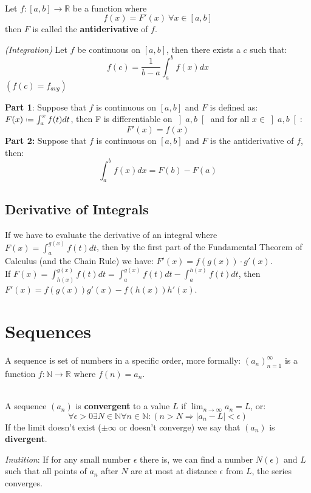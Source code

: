 \documentclass[8pt,a4paper]{extarticle}     %
\theoremstyle{definition}
\theoremstyle{definition}
\theoremstyle{definition}
\newcommand{\R}{\mathbb{R}}
\newcommand{\N}{\mathbb{N}}
\newcommand*{\defeq}{\mathrel{\vcenter{\baselineskip0.5ex \lineskiplimit0pt
            \hbox{\scriptsize.}\hbox{\scriptsize.}}}%
            =}
\begin{document}
\begin{multicols}{4}
\begin{bulletlist}
\end{bulletlist}
\begin{boxdefinition}[Antiderivative] \ \\
	Let $f:[a,b]\rightarrow\R$ be a function where $$f(x) = F'(x) \ \forall x\in[a,b]$$ then $F$ is called the \textbf{antiderivative} of $f$.
\end{boxdefinition}
\begin{boxtheorem}
	\textit{(Integration)} Let $f$ be continuous on $[a,b]$, then there exists a $c$ such that: $$f(c) = \frac{1}{b-a}\int_a^b f(x)dx$$
	$(f(c) = f_{avg})$
\end{boxtheorem}
\begin{boxtheorem}
	\textbf{Part 1}: Suppose that $f$ is continuous on $[a,b]$ and $F$ is defined as: $F(x) \defeq \int_a^x f(t)dt$, then F is differentiable on $\left]a,b\right[$ and for all $x\in\left]a,b\right[$: $$F'(x) = f(x) $$
	\textbf{Part 2:} Suppose that $f$ is continuous on $[a,b]$ and $F$ is the antiderivative of $f$, then:
	$$\int_a^b f(x)dx = F(b) - F(a)$$
\end{boxtheorem}
\subsection{Derivative of Integrals}
If we have to evaluate the derivative of an integral where $F(x) = \int_{a}^{g(x)}f(t)dt$, then by the first part of the Fundamental Theorem of Calculus (and the Chain Rule) we have: $F'(x) = f(g(x))\cdot g'(x)$. \\
If $F(x) = \int_{h(x)}^{g(x)}f(t)dt = \int_{a}^{g(x)}f(t)dt - \int_{a}^{h(x)}f(t)dt$, then $F'(x) = f(g(x))g'(x) - f(h(x))h'(x)$.

\vfill\eject
\columnbreak

\section{Sequences}
\begin{boxdefinition}[Sequence]
	A sequence is set of numbers in a specific order, more formally:
	$(a_n)_{n=1}^\infty$ is a function $f:\N \rightarrow \R$ where $f(n) = a_n$.
\end{boxdefinition}
\begin{boxdefinition}[Convergence] \ \\
	A sequence $(a_n)$ is \textbf{convergent} to a value $L$ if $\lim_{n\to\infty}a_n = L$, or: \\
	$$\forall\epsilon>0\exists N\in\N \forall n\in\N: (n>N \Rightarrow |a_n-L|<\epsilon)$$
	If the limit doesn't exist ($\pm\infty$ or doesn't converge) we say that $(a_n)$ is \textbf{divergent}.
\end{boxdefinition}
\textit{Inutition}: If for any small number $\epsilon$ there is, we can find a number $N(\epsilon)$ and $L$ such that all points of $a_n$ after $N$ are at most at distance $\epsilon$ from $L$, the series converges.

\end{multicols}
\end{document}
